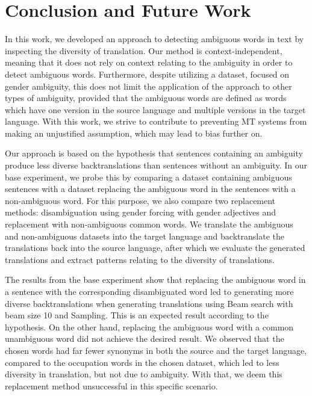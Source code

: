 \chapter{Conclusion and Future Work}
\label{ch:Conclusion}

In this work, we developed an approach to detecting ambiguous words in text by inspecting the diversity of translation. Our method is context-independent, meaning that it does not rely on context relating to the ambiguity in order to detect ambiguous words. Furthermore, despite utilizing a dataset, focused on gender ambiguity, this does not limit the application of the approach to other types of ambiguity, provided that the ambiguous words are defined as words which have one version in the source language and multiple versions in the target language. With this work, we strive to contribute to preventing MT systems from making an unjustified assumption, which may lead to bias further on.

Our approach is based on the hypothesis that sentences containing an ambiguity produce less diverse backtranslations than sentences without an ambiguity. In our base experiment, we probe this by comparing a dataset containing ambiguous sentences with a dataset replacing the ambiguous word in the sentences with a non-ambiguous word. For this purpose, we also compare two replacement methods: disambiguation using gender forcing with gender adjectives and replacement with non-ambiguous common words. We translate the ambiguous and non-ambiguous datasets into the target language and backtranslate the translations back into the source language, after which we evaluate the generated translations and extract patterns relating to the diversity of translations.

The results from the base experiment show that replacing the ambiguous word in a sentence with the corresponding disambiguated word led to generating more diverse backtranslations when generating translations using Beam search with beam size 10 and Sampling. This is an expected result according to the hypothesis. On the other hand, replacing the ambiguous word with a common unambiguous word did not achieve the desired result. We observed that the chosen words had far fewer synonyms in both the source and the target language, compared to the occupation words in the chosen dataset, which led to less diversity in translation, but not due to ambiguity. With that, we deem this replacement method unsuccessful in this specific scenario. 

